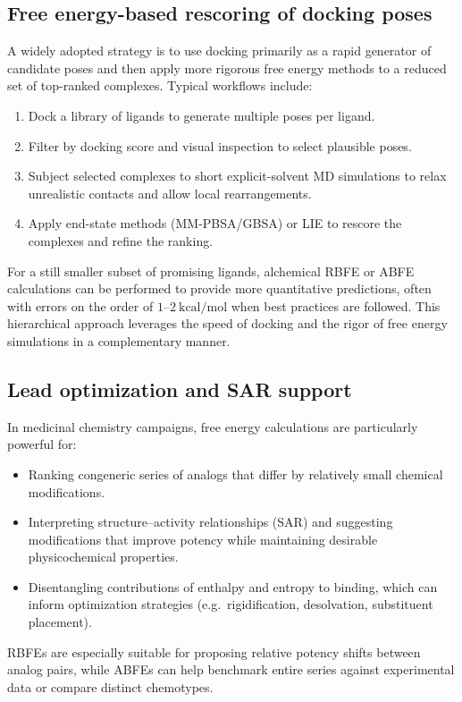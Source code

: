 \documentclass[12pt]{article}
\begin{document}
\subsection{Free energy-based rescoring of docking poses}

A widely adopted strategy is to use docking primarily as a rapid generator of candidate poses and then apply more rigorous free energy methods to a reduced set of top-ranked complexes.\cite{CH10_hou2011endpointhou,CH10_michel2006binding} 
Typical workflows include:
\begin{enumerate}
  \item Dock a library of ligands to generate multiple poses per ligand.
  \item Filter by docking score and visual inspection to select plausible poses.
  \item Subject selected complexes to short explicit-solvent MD simulations to relax unrealistic contacts and allow local rearrangements.
  \item Apply end-state methods (MM-PBSA/GBSA) or LIE to rescore the complexes and refine the ranking.
\end{enumerate}

For a still smaller subset of promising ligands, alchemical RBFE or ABFE calculations can be performed to provide more quantitative predictions, often with errors on the order of \(1\)--\(2\ \mathrm{kcal/mol}\) when best practices are followed.\cite{CH10_wang2015accurate,CH10_aldeghi2018accurate} 
This hierarchical approach leverages the speed of docking and the rigor of free energy simulations in a complementary manner. 

\subsection{Lead optimization and SAR support}

In medicinal chemistry campaigns, free energy calculations are particularly powerful for:
\begin{itemize}
  \item Ranking congeneric series of analogs that differ by relatively small chemical modifications.
  \item Interpreting structure--activity relationships (SAR) and suggesting modifications that improve potency while maintaining desirable physicochemical properties.
  \item Disentangling contributions of enthalpy and entropy to binding, which can inform optimization strategies (e.g.\ rigidification, desolvation, substituent placement).\cite{CH10_gilson1997calculation} 
\end{itemize}
RBFEs are especially suitable for proposing relative potency shifts between analog pairs, while ABFEs can help benchmark entire series against experimental data or compare distinct chemotypes. 
\end{document}
